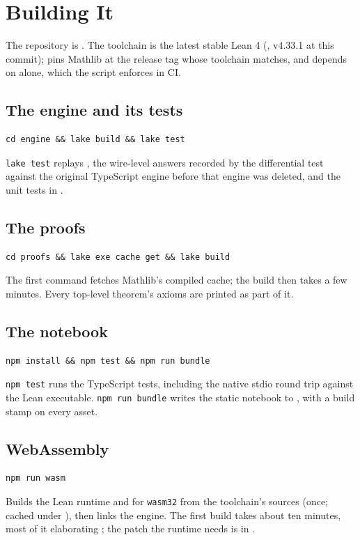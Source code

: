 \chapter{Building It}\label{app:build}

The repository is . The toolchain is the latest stable Lean 4
(, v4.33.1 at this commit);  pins Mathlib at the
release tag whose toolchain matches, and  depends on  alone, which the
script  enforces in CI.

\section*{The engine and its tests}
\begin{verbatim}
cd engine && lake build && lake test
\end{verbatim}
\texttt{lake test} replays , the wire-level answers recorded by the
differential test against the original TypeScript engine before that engine was deleted, and
the unit tests in .

\section*{The proofs}
\begin{verbatim}
cd proofs && lake exe cache get && lake build
\end{verbatim}
The first command fetches Mathlib's compiled cache; the build then takes a few minutes. Every
top-level theorem's axioms are printed as part of it.

\section*{The notebook}
\begin{verbatim}
npm install && npm test && npm run bundle
\end{verbatim}
\texttt{npm test} runs the TypeScript tests, including the native stdio round trip against the
Lean executable. \texttt{npm run bundle} writes the static notebook to
, with a build stamp on every asset.

\section*{WebAssembly}
\begin{verbatim}
npm run wasm
\end{verbatim}
Builds the Lean runtime and  for \texttt{wasm32} from the toolchain's sources (once;
cached under ), then links the engine. The first build takes about
ten minutes, most of it elaborating ; the patch the runtime needs is in
.

